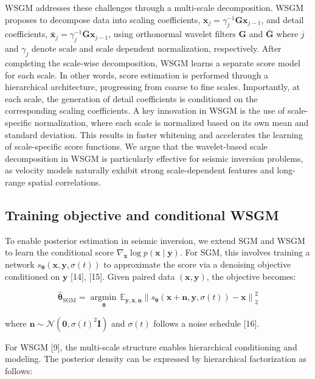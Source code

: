 \documentclass[
]{article}
\begin{document}
WSGM addresses these challenges through a multi-scale decomposition.
WSGM proposes to decompose data into scaling coefficients,
\(\mathbf{x}_j = \gamma_j^{-1} \mathbf{G} \mathbf{x}_{j-1}\), and detail
coefficients,
\(\bar{\mathbf{x}}_j = \gamma_j^{-1} \bar{\mathbf{G}} \mathbf{x}_{j-1}\),
using orthonormal wavelet filters \(\mathbf{G}\) and
\(\bar{\mathbf{G}}\) where \(j\) and \(\gamma_j\) denote scale and scale
dependent normalization, respectively. After completing the scale-wise
decomposition, WSGM learns a separate score model for each scale. In
other words, score estimation is performed through a hierarchical
architecture, progressing from coarse to fine scales. Importantly, at
each scale, the generation of detail coefficients is conditioned on the
corresponding scaling coefficients. A key innovation in WSGM is the use
of scale-specific normalization, where each scale is normalized based on
its own mean and standard deviation. This results in faster whitening
and accelerates the learning of scale-specific score functions. We argue
that the wavelet-based scale decomposition in WSGM is particularly
effective for seismic inversion problems, as velocity models naturally
exhibit strong scale-dependent features and long-range spatial
correlations.

\subsection{Training objective and conditional
WSGM}\label{training-objective-and-conditional-wsgm}

To enable posterior estimation in seismic inversion, we extend SGM and
WSGM to learn the conditional score
\(\nabla_{\mathbf{x}} \log p(\mathbf{x} \mid \mathbf{y})\). For SGM,
this involves training a network
\(s_{\boldsymbol{\theta}}(\mathbf{x}, \mathbf{y}, \sigma(t))\) to
approximate the score via a denoising objective conditioned on
\(\mathbf{y}\) {[}14{]}, {[}15{]}. Given paired data
\((\mathbf{x}, \mathbf{y})\), the objective becomes:

\[
\widehat{\boldsymbol{\theta}}_{\text{SGM}} = \mathop{\mathrm{argmin}\,}\limits_{\boldsymbol{\theta}}\mathbb{E}_{\mathbf{y},\mathbf{x}, \mathbf{n}} \left\| s_{\boldsymbol{\theta}}(\mathbf{x} + \mathbf{n}, \mathbf{y}, \sigma(t)) - \mathbf{x} \right\|_2^2
\]

where
\(\mathbf{n} \sim \mathcal{N}(\mathbf{0}, \sigma(t)^2 \mathbf{I})\) and
\(\sigma(t)\) follows a noise schedule {[}16{]}.

For WSGM {[}9{]}, the multi-scale structure enables hierarchical
conditioning and modeling. The posterior density can be expressed by
hierarchical factorization as follows:
\end{document}
